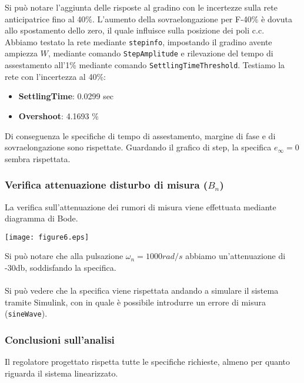 \documentclass{article}
\begin{document}
Si può notare l'aggiunta delle risposte al gradino con le incertezze sulla rete anticipatrice fino al 40\%. L'aumento della sovraelongazione per F-40\% è dovuta allo spostamento dello zero, il quale influisce sulla posizione dei poli c.c.\\

Abbiamo testato la rete mediante \texttt{stepinfo}, impostando il gradino avente ampiezza $W$, mediante comando \texttt{StepAmplitude} e rilevazione del tempo di assestamento all'1\% mediante comando \texttt{SettlingTimeThreshold}. Testiamo la rete con l'incertezza al 40\%:

\begin{itemize}
    \item \textbf{SettlingTime}: 0.0299 sec
    \item \textbf{Overshoot}: 4.1693 \%
\end{itemize}

Di conseguenza le specifiche di tempo di assestamento, margine di fase e di sovraelongazione sono rispettate. Guardando il grafico di step, la specifica $e_\infty=0$ sembra rispettata. 

\subsubsection{Verifica attenuazione disturbo di misura ($B_n$)}

La verifica sull'attenuazione dei rumori di misura viene effettuata mediante diagramma di Bode.

\begin{center}
    \texttt{[image: figure6.eps]}
\end{center}

Si può notare che alla pulsazione $\omega_n=1000 rad/s$ abbiamo un'attenuazione di -30db, soddisfando la specifica.\\\\

Si può vedere che la specifica viene rispettata andando a simulare il sistema tramite Simulink, con in quale è possibile introdurre un errore di misura (\texttt{sineWave}).

\subsubsection{Conclusioni sull'analisi}

Il regolatore progettato rispetta tutte le specifiche richieste, almeno per quanto riguarda il sistema linearizzato.
\end{document}
